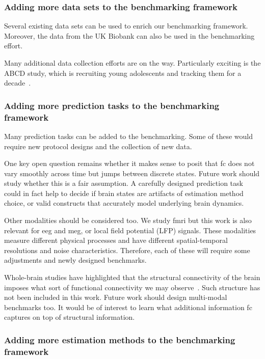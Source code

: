 \subsubsection{Adding more data sets to the benchmarking framework}

Several existing data sets can be used to enrich our benchmarking framework.
Moreover, the data from the UK Biobank can also be used in the benchmarking effort.

Many additional data collection efforts are on the way.
Particularly exciting is the ABCD study, which is recruiting young adolescents and tracking them for a decade~\parencite{Karcher2021}.

\subsubsection{Adding more prediction tasks to the benchmarking framework}\label{subsec:spurious-brain-states}

Many prediction tasks can be added to the benchmarking.
Some of these would require new protocol designs and the collection of new data.

One key open question remains whether it makes sense to posit that \gls{fc} does not vary smoothly across time but jumps between discrete states.
Future work should study whether this is a fair assumption.
A carefully designed prediction task could in fact help to decide if brain states are artifacts of estimation method choice, or valid constructs that accurately model underlying brain dynamics.

Other modalities should be considered too.
We study \gls{fmri} but this work is also relevant for \gls{eeg} and \gls{meg}, or local field potential (LFP) signals.
These modalities measure different physical processes and have different spatial-temporal resolutions and noise characteristics.
Therefore, each of these will require some adjustments and newly designed benchmarks.

Whole-brain studies have highlighted that the structural connectivity of the brain imposes what sort of functional connectivity we may observe~\parencite{vandenHeuvel2009, Deco2011}.
Such structure has not been included in this work.
Future work should design multi-modal benchmarks too.
It would be of interest to learn what additional information \gls{fc} captures on top of structural information.

\subsubsection{Adding more estimation methods to the benchmarking framework}

